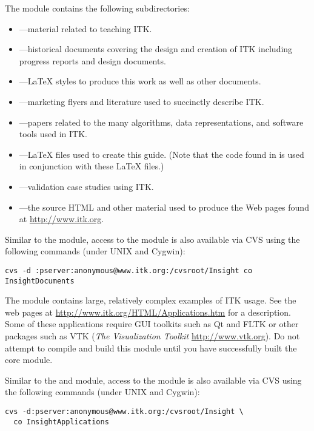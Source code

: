 The  module contains the following subdirectories:
\begin{itemize}
        \item {}---material related to
        teaching ITK.
        \item {}---historical documents covering
        the design and creation of ITK including progress reports and 
        design documents.
        \item {}---\LaTeX{} styles to produce this
        work as well as other documents.
        \item {}---marketing flyers and 
        literature used to succinctly describe ITK.
        \item {}---papers related to the many
        algorithms, data representations, and software tools used in ITK.
        \item {}---\LaTeX{} files used to
        create this guide. (Note that the code found in
         is used in conjunction with these \LaTeX{}
        files.)
        \item {}---validation case studies
        using ITK.
        \item {}---the source HTML and other material
        used to produce the Web pages found at \url{http://www.itk.org}.
\end{itemize}

Similar to the  module, access to the 
module is also available via CVS using the following commands (under UNIX and
Cygwin):
\begin{verbatim}
cvs -d :pserver:anonymous@www.itk.org:/cvsroot/Insight co InsightDocuments
\end{verbatim}

The  module contains large, relatively complex
examples of ITK usage. See the web pages at 
\url{http://www.itk.org/HTML/Applications.htm} for a description. Some of 
these applications require GUI toolkits such as Qt and FLTK or other packages
such as VTK (\emph{The Visualization Toolkit}
\url{http://www.vtk.org}). Do not attempt to compile and build this module
until you have successfully built the core  module.

Similar to the  and  module, access to 
the  module is also available via CVS using the 
following commands (under UNIX and Cygwin):
\begin{verbatim}
cvs -d:pserver:anonymous@www.itk.org:/cvsroot/Insight \ 
  co InsightApplications
\end{verbatim}

